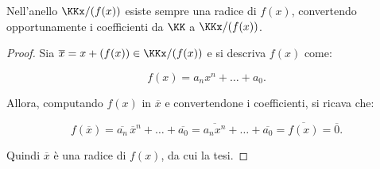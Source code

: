 \begin{proposition}
    \label{prop:radice_quoziente}
    Nell'anello $\KKx/(f(x))$ esiste sempre una radice di $f(x)$,
    convertendo opportunamente i coefficienti da $\KK$ a $\KKx/(f(x))$.
\end{proposition}

\begin{proof}
    Sia $\overline{x} = x + (f(x)) \in \KKx/(f(x))$ e si descriva $f(x)$ come:

    \[ f(x)=a_nx^n+\ldots+a_0. \]

    Allora, computando $f(x)$ in $\overline{x}$ e convertendone
    i coefficienti, si ricava che:

    \[f(\overline{x})=\overline{a_n} \, \overline{x}^n + \ldots + \overline{a_0} =
        \overline{a_n x^n} + \ldots + \overline{a_0} = \overline{f(x)} =
        \overline{0}.\]

    Quindi $\overline{x}$ è una radice di $f(x)$, da cui la tesi.

\end{proof}